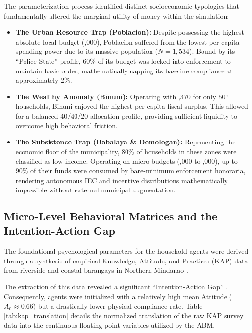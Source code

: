 The parameterization process identified distinct socioeconomic typologies that fundamentally altered the marginal utility of money within the simulation:
\begin{itemize}
    \item \textbf{The Urban Resource Trap (Poblacion):} Despite possessing the highest absolute local budget (,000), Poblacion suffered from the lowest per-capita spending power due to its massive population ($N=1,534$). Bound by its ``Police State'' profile, 60\% of its budget was locked into enforcement to maintain basic order, mathematically capping its baseline compliance at approximately 2\%.
    \item \textbf{The Wealthy Anomaly (Binuni):} Operating with ,370 for only 507 households, Binuni enjoyed the highest per-capita fiscal surplus. This allowed for a balanced 40/40/20 allocation profile, providing sufficient liquidity to overcome high behavioral friction.
    \item \textbf{The Subsistence Trap (Babalaya \& Demologan):} Representing the economic floor of the municipality, 80\% of households in these zones were classified as low-income. Operating on micro-budgets (,000 to ,000), up to 90\% of their funds were consumed by bare-minimum enforcement honoraria, rendering autonomous IEC and incentive distributions mathematically impossible without external municipal augmentation.
\end{itemize}

\subsection{Micro-Level Behavioral Matrices and the Intention-Action Gap}
The foundational psychological parameters for the household agents were derived through a synthesis of empirical Knowledge, Attitude, and Practices (KAP) data from riverside and coastal barangays in Northern Mindanao \citep{Paigalan2025}. 

The extraction of this data revealed a significant ``Intention-Action Gap'' \citep{Geiger2021}. Consequently, agents were initialized with a relatively high mean Attitude ($A_0 \approx 0.66$) but a drastically lower physical compliance rate. Table \ref{tab:kap_translation} details the normalized translation of the raw KAP survey data into the continuous floating-point variables utilized by the ABM.

